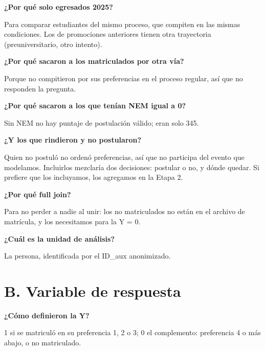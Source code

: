 \documentclass[11pt]{article}
\begin{document}
\textbf{¿Por qué solo egresados 2025?}\par
\begin{guion}Para comparar estudiantes del mismo proceso, que compiten en las mismas condiciones. Los de promociones anteriores tienen otra trayectoria (preuniversitario, otro intento).\end{guion}

\textbf{¿Por qué sacaron a los matriculados por otra vía?}\par
\begin{guion}Porque no compitieron por sus preferencias en el proceso regular, así que no responden la pregunta.\end{guion}

\textbf{¿Por qué sacaron a los que tenían NEM igual a 0?}\par
\begin{guion}Sin NEM no hay puntaje de postulación válido; eran solo 345.\end{guion}

\textbf{¿Y los que rindieron y no postularon?}\par
\begin{guion}Quien no postuló no ordenó preferencias, así que no participa del evento que modelamos. Incluirlos mezclaría dos decisiones: postular o no, y dónde quedar. Si prefiere que los incluyamos, los agregamos en la Etapa 2.\end{guion}

\textbf{¿Por qué full join?}\par
\begin{guion}Para no perder a nadie al unir: los no matriculados no están en el archivo de matrícula, y los necesitamos para la Y = 0.\end{guion}

\textbf{¿Cuál es la unidad de análisis?}\par
\begin{guion}La persona, identificada por el ID\_aux anonimizado.\end{guion}

\section*{B. Variable de respuesta}

\textbf{¿Cómo definieron la Y?}\par
\begin{guion}1 si se matriculó en su preferencia 1, 2 o 3; 0 el complemento: preferencia 4 o más abajo, o no matriculado.\end{guion}
\end{document}
